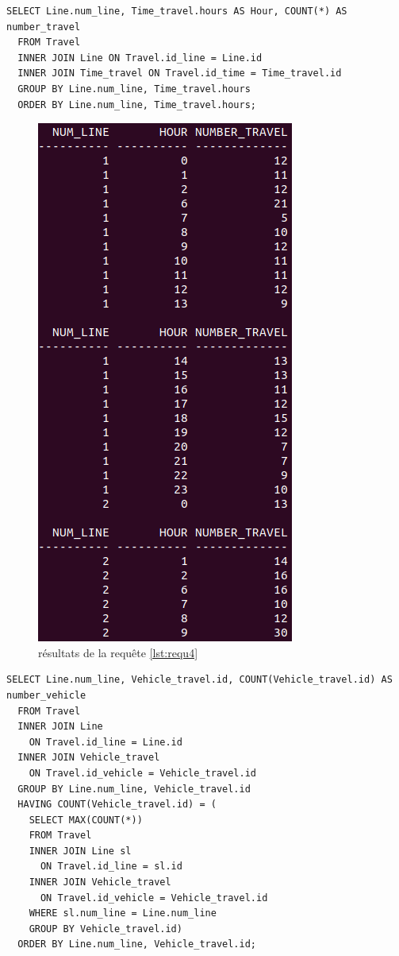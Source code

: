 \documentclass[a4paper,12pt]{report}
\begin{document}
\newpage

\begin{lstlisting}[caption={le nombre de voyages par heure pour chaque ligne}, label={lst:requ4}]
  SELECT Line.num_line, Time_travel.hours AS Hour, COUNT(*) AS number_travel
  FROM Travel
  INNER JOIN Line ON Travel.id_line = Line.id
  INNER JOIN Time_travel ON Travel.id_time = Time_travel.id
  GROUP BY Line.num_line, Time_travel.hours
  ORDER BY Line.num_line, Time_travel.hours;
\end{lstlisting}

\begin{figure}[!ht]
  \centering
  \includegraphics[scale=0.5]{images/requetes_analytiques/requ4.png}
  \caption{résultats de la requête \ref{lst:requ4}}
\end{figure}

\newpage

\begin{lstlisting}[caption={le véhicule le plus utilisé par les voyageurs par ligne}, label={lst:requ5}]
  SELECT Line.num_line, Vehicle_travel.id, COUNT(Vehicle_travel.id) AS number_vehicle
  FROM Travel
  INNER JOIN Line
    ON Travel.id_line = Line.id
  INNER JOIN Vehicle_travel
    ON Travel.id_vehicle = Vehicle_travel.id
  GROUP BY Line.num_line, Vehicle_travel.id
  HAVING COUNT(Vehicle_travel.id) = (
    SELECT MAX(COUNT(*))
    FROM Travel
    INNER JOIN Line sl
      ON Travel.id_line = sl.id
    INNER JOIN Vehicle_travel
      ON Travel.id_vehicle = Vehicle_travel.id
    WHERE sl.num_line = Line.num_line
    GROUP BY Vehicle_travel.id)
  ORDER BY Line.num_line, Vehicle_travel.id;
\end{lstlisting}
\end{document}
